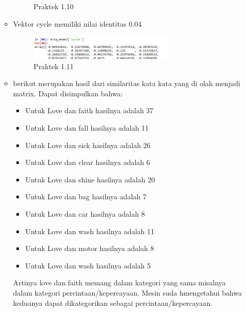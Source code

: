 \begin{enumerate}
\begin{itemize}
\begin{figure}[H]
			\centering
			\caption{Praktek 1.10}
		\end{figure}
		\item Vektor cycle memiliki nilai identitas 0.04
		\hfill\break
		
		\begin{figure}[H]
			\includegraphics[width=7cm]{figures/1174087/5/18.png}
			\centering
			\caption{Praktek 1.11}
		\end{figure}
		\item berikut merupakan hasil dari similaritas kata kata yang di olah menjadi matrix.
		Dapat disimpulkan bahwa:
		\begin{itemize}
		\item Untuk Love dan faith hasilnya adalah 37 
		\item Untuk Love dan fall hasilnya adalah 11
		\item Untuk Love dan sick hasilnya adalah 26
		\item Untuk Love dan clear hasilnya adalah 6
		\item Untuk Love dan shine hasilnya adalah 20
		\item Untuk Love dan bag hasilnya adalah 7
		\item Untuk Love dan car hasilnya adalah 8
		\item Untuk Love dan wash hasilnya adalah 11
		\item Untuk Love dan motor hasilnya adalah 8
		\item Untuk Love dan wash hasilnya adalah 5
		\end{itemize}
		Artinya love dan faith memang dalam kategori yang sama misalnya dalam kategori percintaan/kepercayaan. Mesin suda hmengetahui bahwa keduanya dapat dikategorikan sebagai percintaan/kepercayaan.


\end{itemize}
\end{enumerate}
